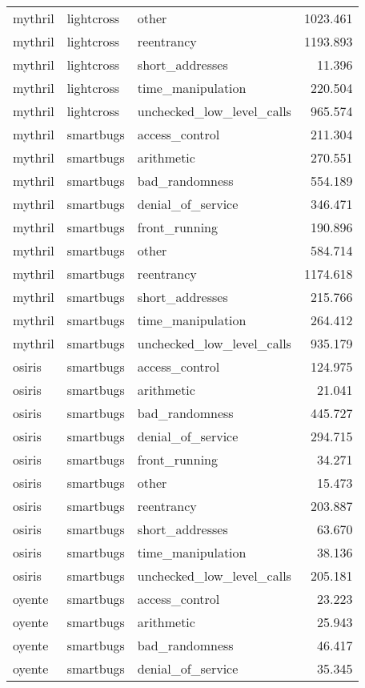 \begin{tabular}[t]{lllr}
\addlinespace
mythril & lightcross & other & 1023.461\\
mythril & lightcross & reentrancy & 1193.893\\
mythril & lightcross & short\_addresses & 11.396\\
mythril & lightcross & time\_manipulation & 220.504\\
mythril & lightcross & unchecked\_low\_level\_calls & 965.574\\
\addlinespace
mythril & smartbugs & access\_control & 211.304\\
mythril & smartbugs & arithmetic & 270.551\\
mythril & smartbugs & bad\_randomness & 554.189\\
mythril & smartbugs & denial\_of\_service & 346.471\\
mythril & smartbugs & front\_running & 190.896\\
\addlinespace
mythril & smartbugs & other & 584.714\\
mythril & smartbugs & reentrancy & 1174.618\\
mythril & smartbugs & short\_addresses & 215.766\\
mythril & smartbugs & time\_manipulation & 264.412\\
mythril & smartbugs & unchecked\_low\_level\_calls & 935.179\\
\addlinespace
osiris & smartbugs & access\_control & 124.975\\
osiris & smartbugs & arithmetic & 21.041\\
osiris & smartbugs & bad\_randomness & 445.727\\
osiris & smartbugs & denial\_of\_service & 294.715\\
osiris & smartbugs & front\_running & 34.271\\
\addlinespace
osiris & smartbugs & other & 15.473\\
osiris & smartbugs & reentrancy & 203.887\\
osiris & smartbugs & short\_addresses & 63.670\\
osiris & smartbugs & time\_manipulation & 38.136\\
osiris & smartbugs & unchecked\_low\_level\_calls & 205.181\\
\addlinespace
oyente & smartbugs & access\_control & 23.223\\
oyente & smartbugs & arithmetic & 25.943\\
oyente & smartbugs & bad\_randomness & 46.417\\
oyente & smartbugs & denial\_of\_service & 35.345\\

\end{tabular}
